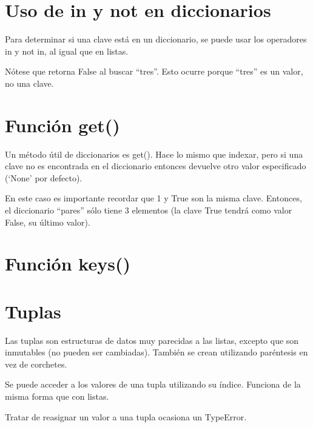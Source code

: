 \documentclass{report}
\newcommand{\simple}[1]{`#1'}
\newcommand{\doble}[1]{``#1''}
\begin{document}
\section{Uso de in y not en diccionarios}

Para determinar si una clave está en un diccionario, se puede usar los operadores in y not in, al igual que en listas.


Nótese que retorna False al buscar \doble{tres}. Esto ocurre porque \doble{tres} es un valor, no una clave.

\section{Función get()}

Un método útil de diccionarios es get(). Hace lo mismo que indexar, pero si una clave no es encontrada en el diccionario entonces devuelve otro valor especificado (\simple{None} por defecto).


En este caso es importante recordar que 1 y True son la misma clave. Entonces, el diccionario \doble{pares} sólo tiene 3 elementos (la clave True tendrá como valor False, su último valor).


\section{Función keys()}

\section{Tuplas}

Las tuplas son estructuras de datos muy parecidas a las listas, excepto que son inmutables (no pueden ser cambiadas). También se crean utilizando paréntesis en vez de corchetes.



Se puede acceder a los valores de una tupla utilizando su índice. Funciona de la misma forma que con listas.


Tratar de reasignar un valor a una tupla ocasiona un TypeError.
\end{document}
